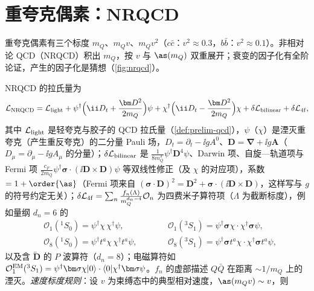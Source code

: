 \section{重夸克偶素：NRQCD}\label{sec:heavy-nrqcd}

重夸克偶素有三个标度 $m_Q$、$m_Qv$、$m_Qv^2$（$c\bar c$：$v^2\approx0.3$，$b\bar b$：$v^2\approx0.1$\cite[第~II.A~节]{BodwinBraatenLepage1995}）。非相对论 QCD（NRQCD）积出 $m_Q$，按 $v$ 与 $\as(m_Q)$ 双重展开\cite{CaswellLepage1986,BodwinBraatenLepage1995}；衰变的因子化有全阶论证，产生的因子化是猜想（\cref{fig:nrqcd}）。

\begin{definition}\label{def:heavy-nrqcd}
NRQCD 的拉氏量为
\begin{equation}\label{eq:heavy-LNRQCD}
\mathcal L_{\rm NRQCD}=\mathcal L_{\rm light}+\psi^\dagger\Big(\ii D_t+\frac{\bm D^2}{2m_Q}\Big)\psi+\chi^\dagger\Big(\ii D_t-\frac{\bm D^2}{2m_Q}\Big)\chi+\delta\mathcal L_{\rm bilinear}+\delta\mathcal L_{\rm 4f},
\end{equation}
其中 $\mathcal L_{\rm light}$ 是轻夸克与胶子的 QCD 拉氏量（\cref{def:prelim-qcd}），$\psi$（$\chi$）是湮灭重夸克（产生重反夸克）的二分量 Pauli 场，$D_t=\partial_t-\ii gA^0$、$\bm D=\bm\nabla+\ii g\bm A$（$D_\mu=\partial_\mu-\ii gA_\mu$ 的分量）；$\delta\mathcal L_{\rm bilinear}$ 是 $\frac{1}{8m_Q^3}\psi^\dagger\bm D^4\psi$、Darwin 项、自旋—轨道项与 Fermi 项 $\frac{c_F}{2m_Q}\psi^\dagger\bm\sigma\cdot(\ii\bm D\times\bm D)\psi$ 等双线性修正（及 $\chi$ 的对应项），系数 $=1+\order{\as}$（Fermi 项来自 $(\bm\sigma\cdot\bm D)^2=\bm D^2+\bm\sigma\cdot(\ii\bm D\times\bm D)$，这样写与 $g$ 的符号约定无关）；$\delta\mathcal L_{\rm 4f}=\sum_n\frac{f_n(\Lambda)}{m_Q^{d_n-4}}\mathcal O_n$ 为四费米子算符项（$\Lambda$ 为截断标度），例如量纲 $d_n=6$ 的
\begin{equation}\label{eq:heavy-4f}
\begin{aligned}
&\mathcal O_1({}^1S_0)=\psi^\dagger\chi\,\chi^\dagger\psi,&\qquad&\mathcal O_1({}^3S_1)=\psi^\dagger\bm\sigma\chi\cdot\chi^\dagger\bm\sigma\psi,\\
&\mathcal O_8({}^1S_0)=\psi^\dagger t^a\chi\,\chi^\dagger t^a\psi,&\qquad&\mathcal O_8({}^3S_1)=\psi^\dagger\bm\sigma t^a\chi\cdot\chi^\dagger\bm\sigma t^a\psi,
\end{aligned}
\end{equation}
以及含 $\overleftrightarrow{\bm D}$ 的 $P$ 波算符（$d_n=8$）；电磁算符如 $\mathcal O^{\rm EM}_1({}^3S_1)=\psi^\dagger\bm\sigma\chi|0\rangle\cdot\langle0|\chi^\dagger\bm\sigma\psi$。$f_n$ 的虚部描述 $Q\bar Q$ 在距离 $\sim1/m_Q$ 上的湮灭。\emph{速度标度规则}：设 $v$ 为束缚态中的典型相对速度，$\as(m_Qv)\sim v$，则

\end{definition}
